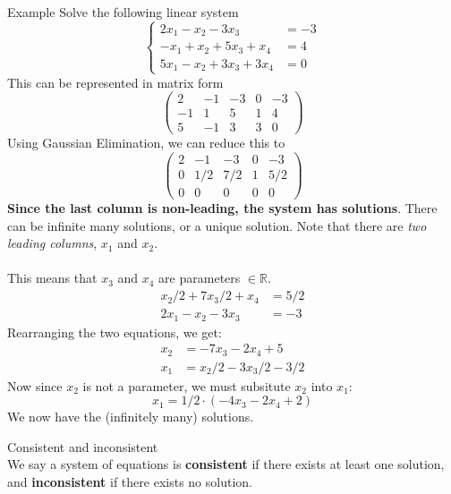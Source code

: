 \documentclass[journal, letterpaper]{IEEEtran}
\begin{document}
    \begin{myboxg}{Example} Solve the following linear system$$
    \begin{cases}
        2x_1 - x_2 - 3x_3 &= -3 \\ 
        -x_1 + x_2 + 5x_3 + x_4 &= 4 \\
        5x_1 - x_2 + 3x_3 + 3x_4 &= 0
    \end{cases}$$
    This can be represented in matrix form
    $$ 
    \begin{pmatrix}
        2 & -1 & -3 & 0 & -3 \\
        -1 & 1 & 5 & 1 & 4 \\ 
        5 & -1 & 3 & 3 & 0 
    \end{pmatrix}
    $$
    Using Gaussian Elimination, we can reduce this to
    $$ 
    \begin{pmatrix}
        2 & -1 & -3 & 0 & -3 \\ 
        0 & 1/2 & 7/2 & 1 & 5/2 \\ 
        0 & 0 & 0 & 0 & 0
    \end{pmatrix}
    $$
    \textbf{Since the last column is non-leading, the system has solutions}. There can be infinite many solutions, or 
    a unique solution. Note that there are \textit{two leading columns}, $x_1$ and $x_2$. \\ \\ 
    This means that $x_3$ and $x_4$ are parameters $\in \mathbb{R}$.
    \begin{align*}
    x_2 /2 + 7x_3/2 + x_4 &= 5/2 \\
    2x_1 - x_2 - 3x_3 &= -3 
    \end{align*}
    Rearranging the two equations, we get:
    \begin{align*}
    x_2 &= -7x_3 - 2x_4 + 5 \\
    x_1 &= x_2/2 - 3x_3/2 - 3/2
    \end{align*}
    Now since $x_2$ is not a parameter, we must subsitute $x_2$ into $x_1$:
    $$
    x_1 = 1/2 \cdot (-4x_3 - 2x_4 + 2)
    $$
    We now have the (infinitely many) solutions.
\end{myboxg}
    \newpage
    \begin{myboxr}{Consistent and inconsistent} \\
        We say a system of equations is \textbf{consistent} if there exists at least one solution,
        and \textbf{inconsistent} if there exists no solution.
    \end{myboxr}
\end{document}
